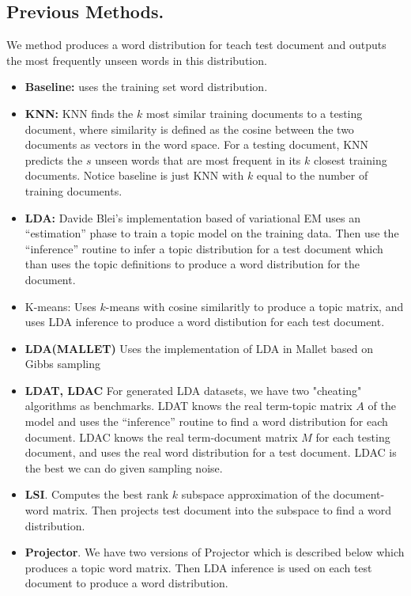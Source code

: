 \subsection{Previous Methods.}

We method produces a word distribution for teach test document and
outputs the most frequently unseen words in this distribution.

\begin{itemize}

\item
{\bf Baseline:} uses the training set word distribution. 

\item
{\bf KNN:} KNN finds the $k$ most similar training documents to a
testing document, where similarity is defined as the cosine between
the two documents as vectors in the word space. For a testing
document, KNN predicts the $s$ unseen words that are most frequent in
its $k$ closest training documents. Notice baseline is just KNN with
$k$ equal to the number of training documents.


\item
{\bf LDA:} Davide Blei's implementation \cite{LDAcode} based of
variational EM uses an ``estimation'' phase to train a topic model on
the training data.  Then use the ``inference'' routine to infer a
topic distribution for a test document which than uses the topic
definitions to produce a word distribution for the document.

\item
{K-means:} Uses $k$-means with cosine similaritly to produce
a topic matrix, and uses LDA inference to produce a word
distibution for each test document. 

\item
{\bf LDA(MALLET)} Uses the implementation of LDA in Mallet
based on Gibbs sampling \cite{Mallet}

\item {\bf LDAT, LDAC} For generated LDA datasets, we have two
  "cheating" algorithms as benchmarks. LDAT knows the real term-topic
  matrix $A$ of the model and uses the ``inference'' routine to find a
  word distribution for each document.  LDAC knows the real
  term-document matrix $M$ for each testing document, and uses the
  real word distribution for a test document.  LDAC is the best we can
  do given sampling noise.

\item {\bf LSI}.  Computes the best rank $k$ subspace approximation of the document-word
matrix.  Then projects test document into the subspace to find a word distribution.

\item {\bf Projector}. We have two versions of Projector which
is described below which produces a topic word matrix.  Then
LDA inference is used on each test document to produce
a word distribution. 

\end{itemize}

